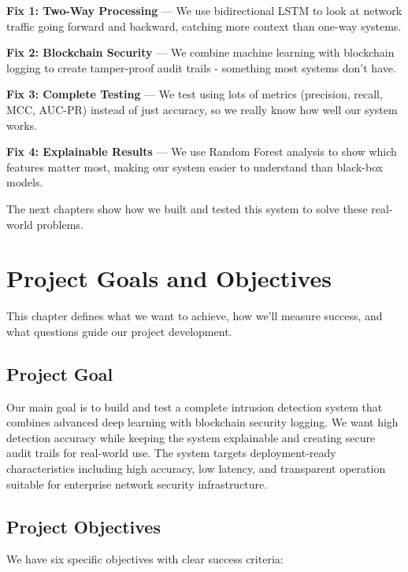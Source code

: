 \documentclass[12pt,a4paper]{report}
\begin{document}
\textbf{Fix 1: Two-Way Processing} --- We use bidirectional LSTM to look at network traffic going forward and backward, catching more context than one-way systems.

\textbf{Fix 2: Blockchain Security} --- We combine machine learning with blockchain logging to create tamper-proof audit trails - something most systems don't have.

\textbf{Fix 3: Complete Testing} --- We test using lots of metrics (precision, recall, MCC, AUC-PR) instead of just accuracy, so we really know how well our system works.

\textbf{Fix 4: Explainable Results} --- We use Random Forest analysis to show which features matter most, making our system easier to understand than black-box models.

The next chapters show how we built and tested this system to solve these real-world problems.

\chapter{Project Goals and Objectives}

This chapter defines what we want to achieve, how we'll measure success, and what questions guide our project development.

\section{Project Goal}

Our main goal is to build and test a complete intrusion detection system that combines advanced deep learning with blockchain security logging. We want high detection accuracy while keeping the system explainable and creating secure audit trails for real-world use. The system targets deployment-ready characteristics including high accuracy, low latency, and transparent operation suitable for enterprise network security infrastructure.

\section{Project Objectives}

We have six specific objectives with clear success criteria:
\end{document}

